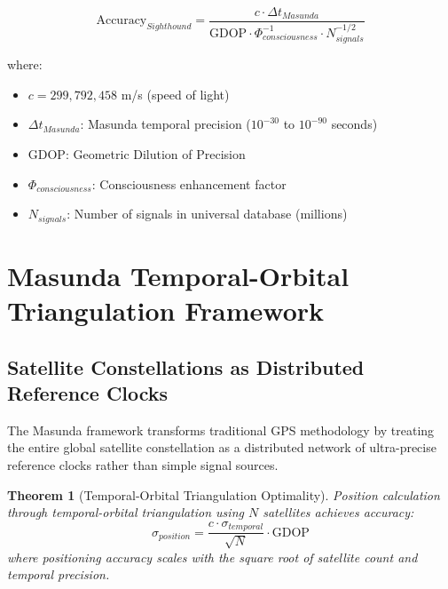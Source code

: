 \documentclass[12pt,a4paper]{article}
\newtheorem{theorem}{Theorem}[section]
\begin{document}
\begin{equation}
\text{Accuracy}_{Sighthound} = \frac{c \cdot \Delta t_{Masunda}}{\text{GDOP} \cdot \Phi_{consciousness}^{-1} \cdot N_{signals}^{-1/2}}
\end{equation}

where:
\begin{itemize}
\item $c = 299,792,458$ m/s (speed of light)
\item $\Delta t_{Masunda}$: Masunda temporal precision ($10^{-30}$ to $10^{-90}$ seconds)
\item $\text{GDOP}$: Geometric Dilution of Precision
\item $\Phi_{consciousness}$: Consciousness enhancement factor
\item $N_{signals}$: Number of signals in universal database (millions)
\end{itemize}

\section{Masunda Temporal-Orbital Triangulation Framework}

\subsection{Satellite Constellations as Distributed Reference Clocks}

The Masunda framework transforms traditional GPS methodology by treating the entire global satellite constellation as a distributed network of ultra-precise reference clocks rather than simple signal sources.

\begin{theorem}[Temporal-Orbital Triangulation Optimality]
Position calculation through temporal-orbital triangulation using $N$ satellites achieves accuracy:
\begin{equation}
\sigma_{position} = \frac{c \cdot \sigma_{temporal}}{\sqrt{N}} \cdot \text{GDOP}
\end{equation}
where positioning accuracy scales with the square root of satellite count and temporal precision.
\end{theorem}
\end{document}
